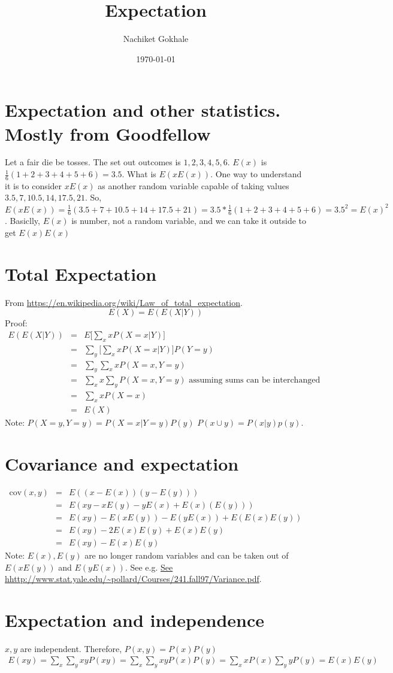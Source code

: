\documentclass{article}
\newcommand{\beq}{\begin{equation}}
\newcommand{\eeq}{\end{equation}}
\newcommand{\ber}{\begin{eqnarray}}
\newcommand{\eer}{\end{eqnarray}}
\begin{document}
\title{Expectation}
\author{Nachiket Gokhale}
\date{\today}
\maketitle
\section{Expectation and other statistics. Mostly from Goodfellow}
Let a fair die be tosses. The set out outcomes is ${1,2,3,4,5,6}$. $E(x)$ is $\frac{1}{6}(1+2+3+4+5+6)=3.5$. What is $E(xE(x))$. One way to understand it is to consider $xE(x)$ as another random variable capable of taking values ${3.5,7,10.5,14,17.5,21}$. So, $E(xE(x))=\frac{1}{6}(3.5+7+10.5+14+17.5+21)=3.5*\frac{1}{6}(1+2+3+4+5+6)=3.5^2=E(x)^2$. Basiclly, $E(x)$ is number, not a random variable, and we can take it outside to get $E(x)E(x)$ 
\section{Total Expectation}
From \url{https://en.wikipedia.org/wiki/Law_of_total_expectation}.
\beq
E(X) = E(E(X|Y))
\eeq
Proof:
\ber
E(E(X|Y)) &=& E\Big[\sum_{x}xP(X=x|Y)\Big] \\
&=& \sum_y\Big[\sum_{x}xP(X=x|Y)\Big]P(Y=y) \\
&=& \sum_y\sum_xxP(X=x,Y=y) \\
&=& \sum_x x \sum_yP(X=x,Y=y) \text{ assuming sums can be interchanged } \\
&=& \sum_x x P(X=x) \\
&=& E(X)
\eer
Note: $P(X=y,Y=y)=P(X=x|Y=y)P(y)$  $P(x\cup{y}) = P(x|y)p(y)$.
\section{Covariance and expectation}
\ber
\text{cov}(x,y) &=& E((x-E(x))(y-E(y))) \\
&=& E(xy - xE(y) - yE(x) + E(x)(E(y))) \\
&=& E(xy)- E(xE(y)) - E(yE(x)) + E(E(x)E(y)) \\
&=& E(xy) -2E(x)E(y) + E(x)E(y) \\
&=& E(xy) - E(x)E(y)
\eer
Note: $E(x),E(y)$ are no longer random variables and can be taken out of $E(xE(y))$ and $E(yE(x))$. See e.g. \url{See hhttp://www.stat.yale.edu/~pollard/Courses/241.fall97/Variance.pdf}.
\section{Expectation and independence}
$x,y$ are independent. Therefore, $P(x,y)=P(x)P(y)$
\ber
E(xy) = \sum_{x}\sum_y xy P(xy) =  \sum_{x}\sum_y xy P(x)P(y) = \sum_x xP(x) \sum_y yP(y) = E(x)E(y)
\eer
\end{document}
